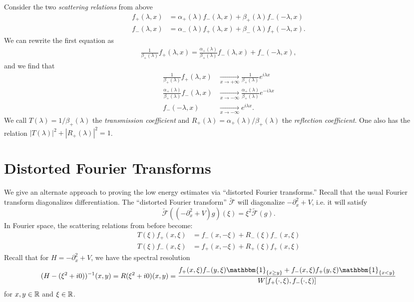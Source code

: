 \begin{remark}
  Consider the two \emph{scattering relations} from above
  \begin{align*}
    f_+(\lambda, x)
    &= \alpha_+(\lambda) f_-(\lambda, x) + \beta_+(\lambda) f_-(-\lambda, x) \\
    f_-(\lambda, x)
    &= \alpha_-(\lambda) f_+(\lambda, x) + \beta_-(\lambda) f_+(-\lambda, x).
  \end{align*}
  We can rewrite the first equation as
  \begin{align*}
    \frac{1}{\beta_+(\lambda)} f_+(\lambda, x)
    = \frac{\alpha_+(\lambda)}{\beta_+(\lambda)} f_-(\lambda, x) + f_-(-\lambda, x),
  \end{align*}
  and we find that
  \begin{align*}
    \frac{1}{\beta_+(\lambda)} f_+(\lambda, x)
    &\xrightarrow[x \to +\infty]{} \frac{1}{\beta_+(\lambda)} e^{i\lambda x} \\
    \frac{\alpha_+(\lambda)}{\beta_+(\lambda)} f_-(\lambda, x)
    &\xrightarrow[x \to -\infty]{} \frac{\alpha_+(\lambda)}{\beta_+(\lambda)} e^{-i\lambda x} \\
    f_-(-\lambda, x)
    &\xrightarrow[x \to -\infty]{} e^{i\lambda x}.
  \end{align*}
  We call $T(\lambda) = 1 / \beta_+(\lambda)$ the
  \emph{transmission coefficient} and
  $R_+(\lambda) = \alpha_+(\lambda) / \beta_+(\lambda)$
  the \emph{reflection coefficient}.
  One also has the relation
  $|T(\lambda)|^2 + |R_+(\lambda)|^2 = 1$.
\end{remark}

\section{Distorted Fourier Transforms}

\begin{remark}
  We give an alternate approach to proving
  the low energy estimates via ``distorted Fourier
  transforms.'' Recall that the usual Fourier transform
  diagonalizes differentiation. The ``distorted
  Fourier transform'' $\widetilde{\mathcal{F}}$
  will diagonalize $-\partial_x^2 + V$, i.e. it will
  satisfy
  \[
    \widetilde{\mathcal{F}}((-\partial_x^2 + V) g)(\xi)
    = \xi^2 \widetilde{\mathcal{F}}(g).
  \]
  In Fourier space, the scattering relations from
  before become:
  \begin{align*}
    T(\xi) f_+(x, \xi)
    &= f_-(x, -\xi) + R_-(\xi) f_-(x, \xi) \\
    T(\xi) f_-(x, \xi)
    &= f_+(x, -\xi) + R_+(\xi) f_+(x, \xi)
  \end{align*}
  Recall that for $H = -\partial_x^2 + V$, we have
  the spectral resolution
  \[
    (H - (\xi^2 + i 0))^{-1}(x, y)
    = R(\xi^2 + i 0)(x, y)
    = \frac{f_+(x, \xi) f_-(y, \xi) \mathbbm{1}_{\{x \ge y\}} + f_-(x, \xi) f_+(y, \xi) \mathbbm{1}_{\{x < y\}}}{W[f_+(\cdot, \xi), f_-(\cdot, \xi)]}
  \]
  for $x, y \in \mathbb{R}$ and $\xi \in \mathbb{R}$.
\end{remark}

